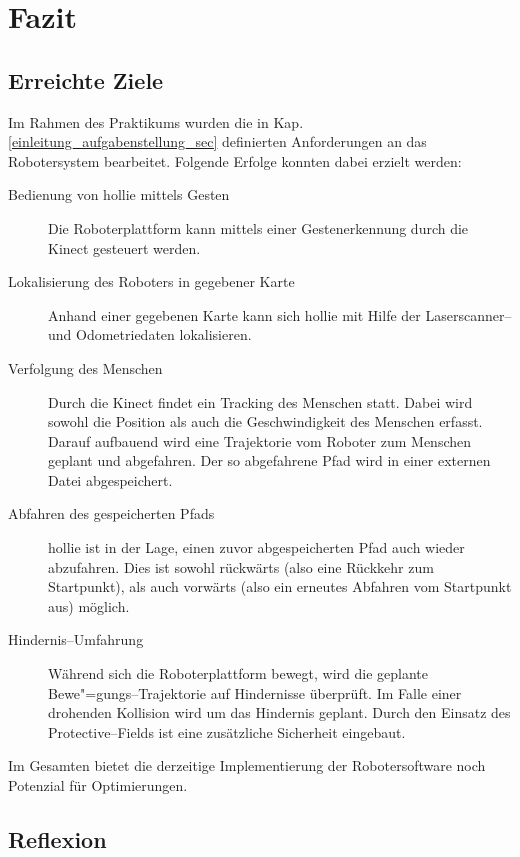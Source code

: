 
\chapter{Fazit}

\section{Erreichte Ziele}
\authorsection{\editorjulian, \editortobias}

Im Rahmen des Praktikums wurden die in Kap. \ref{einleitung_aufgabenstellung_sec} definierten Anforderungen an das Robotersystem bearbeitet.
Folgende Erfolge konnten dabei erzielt werden:

\begin{description}
  \item [Bedienung von \gls{hollie} mittels Gesten]
  		Die Roboterplattform kann mittels einer Gestenerkennung durch die Kinect gesteuert werden.
  \item [Lokalisierung des Roboters in gegebener Karte]
  		Anhand einer gegebenen Karte kann sich \gls{hollie} mit Hilfe der Laserscanner-- und Odometriedaten lokalisieren.
  \item [Verfolgung des Menschen]
			Durch die Kinect findet ein Tracking des Menschen statt.
			Dabei wird sowohl die Position als auch die Geschwindigkeit des Menschen erfasst.
			Darauf aufbauend wird eine Trajektorie vom Roboter zum Menschen geplant und abgefahren.
			Der so abgefahrene Pfad wird in einer externen Datei abgespeichert. 
  \item [Abfahren des gespeicherten Pfads]
			\gls{hollie} ist in der Lage, einen zuvor abgespeicherten Pfad auch wieder abzufahren.
			Dies ist sowohl rückwärts (also eine Rückkehr zum Startpunkt), als auch vorwärts (also ein erneutes Abfahren vom Startpunkt aus) möglich.
  \item [Hindernis--Umfahrung]
			Während sich die Roboterplattform bewegt, wird die geplante
			Bewe"=gungs--Trajektorie auf Hindernisse überprüft.
			Im Falle einer drohenden Kollision wird um das Hindernis geplant.
			Durch den Einsatz des Protective--Fields ist eine zusätzliche Sicherheit eingebaut.
\end{description}

Im Gesamten bietet die derzeitige Implementierung der Robotersoftware noch Potenzial für Optimierungen.

\section{Reflexion}
\authorsection{\editorandreas}
